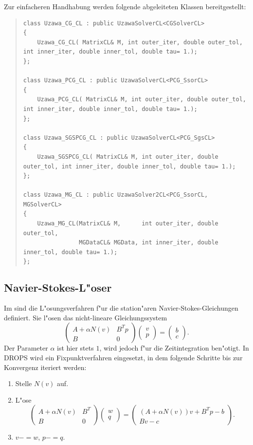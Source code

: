 \documentclass[11pt,a4paper]{article}
\newenvironment{Code}{\begin{quote}\scriptsize}{\end{quote}}
\begin{document}
Zur einfacheren Handhabung werden folgende abgeleiteten Klassen bereitgestellt:
\begin{Code}
\begin{verbatim}
class Uzawa_CG_CL : public UzawaSolverCL<CGSolverCL>
{
    Uzawa_CG_CL( MatrixCL& M, int outer_iter, double outer_tol, int inner_iter, double inner_tol, double tau= 1.);
};

class Uzawa_PCG_CL : public UzawaSolverCL<PCG_SsorCL>
{
    Uzawa_PCG_CL( MatrixCL& M, int outer_iter, double outer_tol, int inner_iter, double inner_tol, double tau= 1.);
};

class Uzawa_SGSPCG_CL : public UzawaSolverCL<PCG_SgsCL>
{
    Uzawa_SGSPCG_CL( MatrixCL& M, int outer_iter, double outer_tol, int inner_iter, double inner_tol, double tau= 1.);
};

class Uzawa_MG_CL : public UzawaSolver2CL<PCG_SsorCL, MGSolverCL>
{
    Uzawa_MG_CL(MatrixCL& M,      int outer_iter, double outer_tol,
                MGDataCL& MGData, int inner_iter, double inner_tol, double tau= 1.);
};
\end{verbatim}
\end{Code}

\subsection{Navier-Stokes-L"oser}
Im sind die L"osungsverfahren f"ur die station"aren
Navier-Stokes-Gleichungen definiert. Sie l"osen das nicht-lineare
Gleichungssystem
$$
\begin{pmatrix}A +\alpha N(v) & B^T p \\ B & 0\end{pmatrix}
\begin{pmatrix}v \\ p\end{pmatrix} = \begin{pmatrix}b \\ c\end{pmatrix}.
$$
Der Parameter $\alpha$ ist hier stets $1$, wird jedoch f"ur die
Zeitintegration ben"otigt. In DROPS wird ein Fixpunktverfahren eingesetzt,
in dem folgende Schritte bis zur Konvergenz iteriert werden:
\begin{enumerate}
\item Stelle $N(v)$ auf.
\item L"ose
$$
\begin{pmatrix}A + \alpha N(v) & B^T \\ B & 0\end{pmatrix}
\begin{pmatrix}w \\ q\end{pmatrix}
=
\begin{pmatrix}(A +\alpha N(v)) v + B^T p - b\\ B v - c\end{pmatrix}.
$$
\item $v-=w$, $p-=q$.
\end{enumerate}
\end{document}
